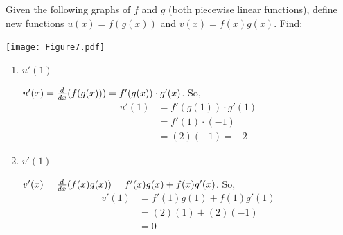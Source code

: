 \documentclass[nooutcomes,handout]{ximera}
\begin{document}
\begin{problem}
  Given the following graphs of $f$ and $g$ (both piecewise
  linear functions), define new functions $u(x) = f(g(x))$ and
  $v(x) = f(x)g(x)$.  Find:

  \begin{image}
    \texttt{[image: Figure7.pdf]}
  \end{image}

  \begin{enumerate}
	
  \item $u'(1)$
    \begin{freeResponse}
      $u'(x) = \frac{d}{dx}(f(g(x))) = f'(g(x)) \cdot g'(x)$.  So,
      \begin{align*}
        u'(1) &= f'(g(1)) \cdot g'(1) \\
              &= f'(1) \cdot (-1) \\
              &= (2)(-1) = -2 
      \end{align*}  
    \end{freeResponse}
		
		
		
	
  \item $v'(1)$
    \begin{freeResponse}
      $v'(x) = \frac{d}{dx}(f(x)g(x)) = f'(x)g(x) + f(x)g'(x)$.  So,
      \begin{align*}
        v'(1) &= f'(1) g(1) + f(1) g'(1) \\
              &= (2)(1) + (2)(-1) \\
              &= 0
      \end{align*}
    \end{freeResponse}
  \end{enumerate}		
			
		
\end{problem}
	
	
	
		
			
\end{document}
